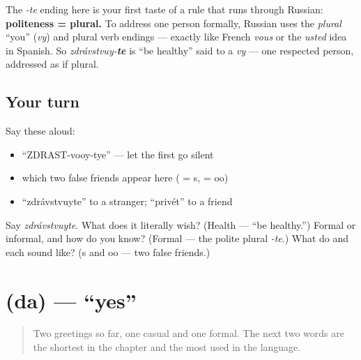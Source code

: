 \begin{grammarlens}[title={Grammar Lens — Russian's formal \emph{you} is plural}]
The \emph{-te} ending here is your first taste of a rule that runs through Russian: \textbf{politeness = plural.} To address one person formally, Russian uses the \emph{plural} \textquotedblleft{}you\textquotedblright{} (\emph{vy}) and plural verb endings — exactly like French \emph{vous} or the \emph{usted} idea in Spanish. So \emph{zdrávstvuy-\textbf{te}} is \textquotedblleft{}be healthy\textquotedblright{} said to a \emph{vy} — one respected person, addressed as if plural.
\end{grammarlens}

\subsection*{Your turn}
Say these aloud:

\begin{itemize}
\raggedright
  \item \textquotedblleft{}ZDRAST-vooy-tye\textquotedblright{} — let the first  go silent
  \item which two false friends appear here ( = s,  = oo)
  \item \textquotedblleft{}zdrávstvuyte\textquotedblright{} to a stranger; \textquotedblleft{}privét\textquotedblright{} to a friend
\end{itemize}

\begin{tcolorbox}[breakable,colback=teal!4,colframe=teal!35!black,title={Before you move on}]
Say \emph{zdrávstvuyte}. What does it literally wish? (Health — \textquotedblleft{}be healthy.\textquotedblright{}) Formal or informal, and how do you know? (Formal — the polite plural \emph{-te}.) What do  and  each sound like? (s and oo — two false friends.)
\end{tcolorbox}
\section[\texorpdfstring{\ru{да} (da)}{да (da)}]{ (da) — \textquotedblleft{}yes\textquotedblright{}}

\label{lesson:RU-C01-da}



\begin{quote}
Two greetings so far, one casual and one formal. The next two words are the shortest in the chapter and the most used in the language.
\end{quote}

